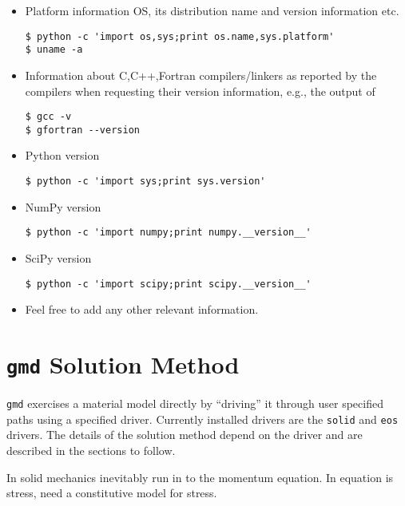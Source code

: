 \documentclass[11pt]{report}
\newcommand{\gmd}{\texttt{gmd}}
\begin{document}
\begin{itemize}
  \item Platform information OS, its distribution name and version information
  etc.
\begin{verbatim}
$ python -c 'import os,sys;print os.name,sys.platform'
$ uname -a
\end{verbatim}

  \item Information about C,C++,Fortran compilers/linkers as reported by the
  compilers when requesting their version information, e.g., the output of
\begin{verbatim}
$ gcc -v
$ gfortran --version
\end{verbatim}

  \item Python version
\begin{verbatim}
$ python -c 'import sys;print sys.version'
\end{verbatim}

\item NumPy version
\begin{verbatim}
$ python -c 'import numpy;print numpy.__version__'
\end{verbatim}

\item SciPy version
\begin{verbatim}
$ python -c 'import scipy;print scipy.__version__'
\end{verbatim}

\item Feel free to add any other relevant information.
\end{itemize}

\chapter{\gmd{} Solution Method}
\gmd{} exercises a material model directly by ``driving'' it through user
specified paths using a specified driver.  Currently installed drivers are the
\texttt{solid} and \texttt{eos} drivers.  The details of the solution method
depend on the driver and are described in the sections to follow.

In solid mechanics inevitably run in to the momentum equation.  In equation is
stress, need a constitutive model for stress.

\end{document}
